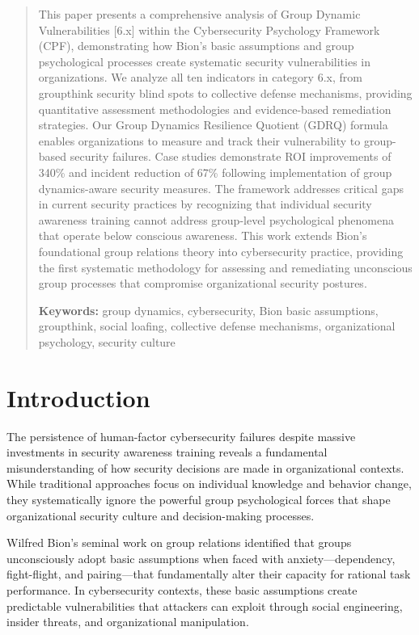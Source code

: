 \documentclass[11pt,a4paper]{article}
\begin{document}
\begin{abstract}
\noindent
This paper presents a comprehensive analysis of Group Dynamic Vulnerabilities [6.x] within the Cybersecurity Psychology Framework (CPF), demonstrating how Bion's basic assumptions and group psychological processes create systematic security vulnerabilities in organizations. We analyze all ten indicators in category 6.x, from groupthink security blind spots to collective defense mechanisms, providing quantitative assessment methodologies and evidence-based remediation strategies. Our Group Dynamics Resilience Quotient (GDRQ) formula enables organizations to measure and track their vulnerability to group-based security failures. Case studies demonstrate ROI improvements of 340\% and incident reduction of 67\% following implementation of group dynamics-aware security measures. The framework addresses critical gaps in current security practices by recognizing that individual security awareness training cannot address group-level psychological phenomena that operate below conscious awareness. This work extends Bion's foundational group relations theory into cybersecurity practice, providing the first systematic methodology for assessing and remediating unconscious group processes that compromise organizational security postures.

\vspace{0.5em}
\noindent\textbf{Keywords:} group dynamics, cybersecurity, Bion basic assumptions, groupthink, social loafing, collective defense mechanisms, organizational psychology, security culture
\end{abstract}

\vspace{1cm}

\section{Introduction}

The persistence of human-factor cybersecurity failures despite massive investments in security awareness training reveals a fundamental misunderstanding of how security decisions are made in organizational contexts. While traditional approaches focus on individual knowledge and behavior change, they systematically ignore the powerful group psychological forces that shape organizational security culture and decision-making processes.

Wilfred Bion's seminal work on group relations \cite{bion1961} identified that groups unconsciously adopt basic assumptions when faced with anxiety---dependency, fight-flight, and pairing---that fundamentally alter their capacity for rational task performance. In cybersecurity contexts, these basic assumptions create predictable vulnerabilities that attackers can exploit through social engineering, insider threats, and organizational manipulation.
\end{document}
